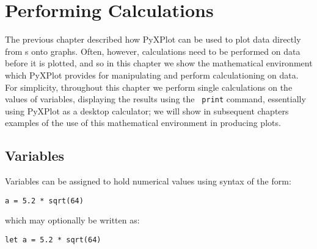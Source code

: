 %
%
%
%
%



\chapter{Performing Calculations}

The previous chapter described how PyXPlot can be used to plot data directly
from \datafile s onto graphs. Often, however, calculations need to be performed
on data before it is plotted, and so in this chapter we show the mathematical
environment which PyXPlot provides for manipulating and perform calculationing
on data.  For simplicity, throughout this chapter we perform single
calculations on the values of variables, displaying the results using the {\tt
print} command, essentially using PyXPlot as a desktop calculator; we will show
in subsequent chapters examples of the use of this mathematical environment in
producing plots.

\section{Variables}

Variables can be assigned to hold numerical values using syntax of the form:

\begin{verbatim}
a = 5.2 * sqrt(64)
\end{verbatim}

\noindent which may optionally be written as:

\begin{verbatim}
let a = 5.2 * sqrt(64)
\end{verbatim}

